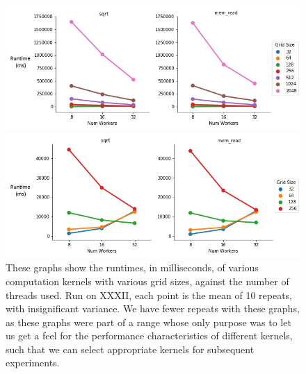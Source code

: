 \begin{figure}[H]
    \centerline{\includegraphics[width=1\textwidth]{graphics/interesting_instances/focustest2_1.png}}
    \centerline{\includegraphics[width=1\textwidth]{graphics/interesting_instances/focustest2_2.png}}
    \caption{These graphs show the runtimes, in milliseconds, of various computation kernels with various grid sizes, against the number of threads used. Run on XXXII, each point is the mean of 10 repeats, with insignificant variance. We have fewer repeats with these graphs, as these graphs were part of a range whose only purpose was to let us get a feel for the performance characteristics of different kernels, such that we can select appropriate kernels for subsequent experiments.}
    \label{fig:focustest2}
\end{figure}



